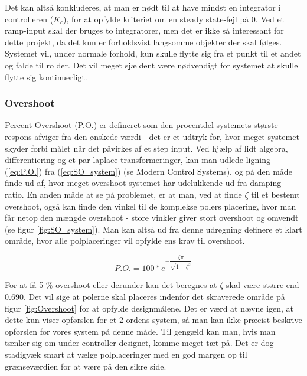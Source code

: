 Det kan altså konkluderes, at man er nødt til at have mindst en integrator i controlleren ($K_{c}$), for at opfylde kriteriet om en steady state-fejl på 0. Ved et ramp-input skal der bruges to integratorer, men det er ikke så interessant for dette projekt, da det kun er forholdsvist langsomme objekter der skal følges. Systemet vil, under normale forhold, kun skulle flytte sig fra et punkt til et andet og falde til ro der. Det vil meget sjældent være nødvendigt for systemet at skulle flytte sig kontinuerligt.

\subsubsection{Overshoot}

Percent Overshoot (P.O.) er defineret som den procentdel systemets største respons afviger fra den ønskede værdi - det er et udtryk for, hvor meget systemet skyder forbi målet når det påvirkes af et step input. Ved hjælp af lidt algebra, differentiering og et par laplace-transformeringer, kan man udlede ligning (\ref{eq:P.O.}) fra (\ref{eq:SO_system}) (se Modern Control Systems\cite{ModernControlSystem}), og på den måde finde ud af, hvor meget overshoot systemet har udelukkende ud fra damping ratio. En anden måde at se på problemet, er at man, ved at finde $\zeta$ til et bestemt overshoot, også kan finde den vinkel til de komplekse polers placering, hvor man får netop den mængde overshoot - store vinkler giver stort overshoot og omvendt (se figur \ref{fig:SO_system}). Man kan altså ud fra denne udregning definere et klart område, hvor alle polplaceringer vil opfylde ens krav til overshoot. 

\begin{equation}\label{eq:P.O.}
P.O.=100*e^{-\dfrac{\zeta\pi}{\sqrt{1-\zeta^2}}}
\end{equation}

For at få 5 $\%$ overshoot eller derunder kan det beregnes at $\zeta$ skal være større end 0.690. Det vil sige at polerne skal placeres indenfor det skraverede område på figur \ref{fig:Overshoot} for at opfylde designmålene. Det er værd at nævne igen, at dette kun viser opførslen for et 2-ordens-system, så man kan ikke præcist beskrive opførslen for vores system på denne måde. Til gengæld kan man, hvis man tænker sig om under controller-designet, komme meget tæt på. Det er dog stadigvæk smart at vælge polplaceringer med en god margen op til grænseværdien for at være på den sikre side.


